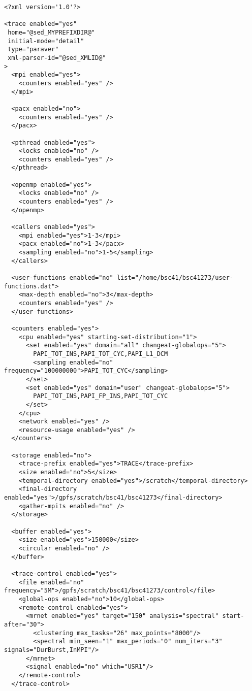 \begin{verbatim}
<?xml version='1.0'?>

<trace enabled="yes"
 home="@sed_MYPREFIXDIR@"
 initial-mode="detail"
 type="paraver"
 xml-parser-id="@sed_XMLID@"
>
  <mpi enabled="yes">
    <counters enabled="yes" />
  </mpi>

  <pacx enabled="no">
    <counters enabled="yes" />
  </pacx>

  <pthread enabled="yes">
    <locks enabled="no" />
    <counters enabled="yes" />
  </pthread>

  <openmp enabled="yes">
    <locks enabled="no" />
    <counters enabled="yes" />
  </openmp>

  <callers enabled="yes">
    <mpi enabled="yes">1-3</mpi>
    <pacx enabled="no">1-3</pacx>
    <sampling enabled="no">1-5</sampling>
  </callers>

  <user-functions enabled="no" list="/home/bsc41/bsc41273/user-functions.dat">
    <max-depth enabled="no">3</max-depth>
    <counters enabled="yes" />
  </user-functions>

  <counters enabled="yes">
    <cpu enabled="yes" starting-set-distribution="1">
      <set enabled="yes" domain="all" changeat-globalops="5">
        PAPI_TOT_INS,PAPI_TOT_CYC,PAPI_L1_DCM
        <sampling enabled="no" frequency="100000000">PAPI_TOT_CYC</sampling>
      </set>
      <set enabled="yes" domain="user" changeat-globalops="5">
        PAPI_TOT_INS,PAPI_FP_INS,PAPI_TOT_CYC
      </set>
    </cpu>
    <network enabled="yes" />
    <resource-usage enabled="yes" />
  </counters>

  <storage enabled="no">
    <trace-prefix enabled="yes">TRACE</trace-prefix>
    <size enabled="no">5</size>
    <temporal-directory enabled="yes">/scratch</temporal-directory>
    <final-directory enabled="yes">/gpfs/scratch/bsc41/bsc41273</final-directory>
    <gather-mpits enabled="no" />
  </storage>

  <buffer enabled="yes">
    <size enabled="yes">150000</size>
    <circular enabled="no" />
  </buffer>

  <trace-control enabled="yes">
    <file enabled="no" frequency="5M">/gpfs/scratch/bsc41/bsc41273/control</file>
    <global-ops enabled="no">10</global-ops>
    <remote-control enabled="yes">
      <mrnet enabled="yes" target="150" analysis="spectral" start-after="30">
        <clustering max_tasks="26" max_points="8000"/>
        <spectral min_seen="1" max_periods="0" num_iters="3" signals="DurBurst,InMPI"/>
      </mrnet>
      <signal enabled="no" which="USR1"/>
    </remote-control>
  </trace-control> 


\end{verbatim}
